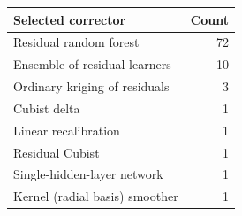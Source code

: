 \begin{tabular}{lr}
\toprule
Selected corrector & Count \\
\midrule
Residual random forest & 72 \\
Ensemble of residual learners & 10 \\
Ordinary kriging of residuals & 3 \\
Cubist delta & 1 \\
Linear recalibration & 1 \\
Residual Cubist & 1 \\
Single-hidden-layer network & 1 \\
Kernel (radial basis) smoother & 1 \\
\bottomrule
\end{tabular}
